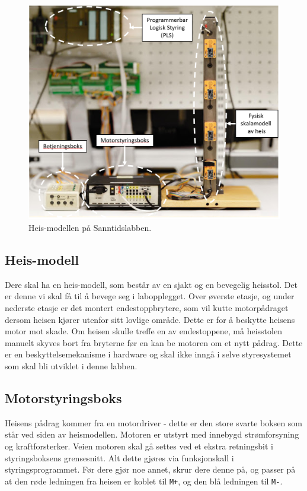 \begin{alphasection}
\begin{figure}[ht!]
    \centering
    \includegraphics[scale=.85]{figures/heis.PNG}
    \caption{Heis-modellen på Sanntidslabben.}
    \label{fig:Heis-modell}
\end{figure}

\subsection{Heis-modell}

Dere skal ha en heis-modell, som består av en sjakt og en bevegelig heisstol. Det er denne vi skal få til å bevege seg i labopplegget. Over øverste etasje, og under nederste etasje er det montert endestoppbrytere, som vil kutte motorpådraget dersom heisen kjører utenfor sitt lovlige område. Dette er for å beskytte heisens motor mot skade. Om heisen skulle treffe en av endestoppene, må heisstolen manuelt skyves bort fra bryterne før en kan be motoren om et nytt pådrag. Dette er en beskyttelsemekanisme i hardware og skal ikke inngå i selve styresystemet som skal bli utviklet i denne labben.



\subsection{Motorstyringsboks}
Heisens pådrag kommer fra en motordriver - dette er den store svarte boksen som står ved siden av heismodellen.  Motoren er utstyrt med innebygd strømforsyning og kraftforsterker. Veien motoren skal gå settes ved et ekstra retningsbit i styringsboksens grensesnitt. Alt dette gjøres via funksjonskall i styringsprogrammet. Før dere gjør noe annet, skrur dere denne på, og passer på at den røde ledningen fra heisen er koblet til \verb|M+|, og den blå ledningen til \verb|M-|.



\end{alphasection}
